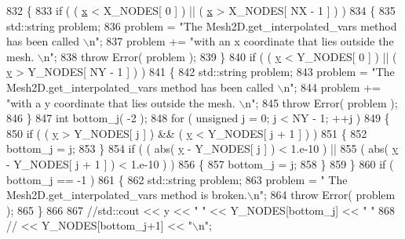 \begin{DoxyCode}
832   \{
833     \textcolor{keywordflow}{if} ( ( \hyperlink{namespaceHeat__plot_aa88370c16b85b784ccbde3ed88bc1991}{x} < X\_NODES[ 0 ] ) || ( \hyperlink{namespaceHeat__plot_aa88370c16b85b784ccbde3ed88bc1991}{x} > X\_NODES[ NX - 1 ] ) )
834     \{
835       std::string problem;
836       problem = \textcolor{stringliteral}{"The Mesh2D.get\_interpolated\_vars method has been called \(\backslash\)n"};
837       problem += \textcolor{stringliteral}{"with an x coordinate that lies outside the mesh. \(\backslash\)n"};
838       \textcolor{keywordflow}{throw} Error( problem );
839     \}
840     \textcolor{keywordflow}{if} ( ( \hyperlink{ODE__BVP__test_8cpp_adf764cbdea00d65edcd07bb9953ad2b7ae1f9fdb8b786c63efc4ce44eeacd17f2}{y} < Y\_NODES[ 0 ] ) || ( \hyperlink{ODE__BVP__test_8cpp_adf764cbdea00d65edcd07bb9953ad2b7ae1f9fdb8b786c63efc4ce44eeacd17f2}{y} > Y\_NODES[ NY - 1 ] ) )
841     \{
842       std::string problem;
843       problem = \textcolor{stringliteral}{"The Mesh2D.get\_interpolated\_vars method has been called \(\backslash\)n"};
844       problem += \textcolor{stringliteral}{"with a y coordinate that lies outside the mesh. \(\backslash\)n"};
845       \textcolor{keywordflow}{throw} Error( problem );
846     \}
847     \textcolor{keywordtype}{int} bottom\_j( -2 );
848     \textcolor{keywordflow}{for} ( \textcolor{keywordtype}{unsigned} j = 0; j < NY - 1; ++j )
849     \{
850       \textcolor{keywordflow}{if} ( ( \hyperlink{ODE__BVP__test_8cpp_adf764cbdea00d65edcd07bb9953ad2b7ae1f9fdb8b786c63efc4ce44eeacd17f2}{y} > Y\_NODES[ j ] ) && ( \hyperlink{ODE__BVP__test_8cpp_adf764cbdea00d65edcd07bb9953ad2b7ae1f9fdb8b786c63efc4ce44eeacd17f2}{y} < Y\_NODES[ j + 1 ] ) )
851       \{
852         bottom\_j = j;
853       \}
854       \textcolor{keywordflow}{if} ( ( abs( \hyperlink{ODE__BVP__test_8cpp_adf764cbdea00d65edcd07bb9953ad2b7ae1f9fdb8b786c63efc4ce44eeacd17f2}{y} - Y\_NODES[ j ] ) < 1.e-10 ) ||
855            ( abs( \hyperlink{ODE__BVP__test_8cpp_adf764cbdea00d65edcd07bb9953ad2b7ae1f9fdb8b786c63efc4ce44eeacd17f2}{y} - Y\_NODES[ j + 1 ] ) < 1.e-10 ) )
856       \{
857         bottom\_j = j;
858       \}
859     \}
860     \textcolor{keywordflow}{if} ( bottom\_j == -1 )
861     \{
862       std::string problem;
863       problem = \textcolor{stringliteral}{" The Mesh2D.get\_interpolated\_vars method is broken.\(\backslash\)n"};
864       \textcolor{keywordflow}{throw} Error( problem );
865     \}
866 
867     \textcolor{comment}{//std::cout << y << " " << Y\_NODES[bottom\_j] << " "}
868     \textcolor{comment}{//          << Y\_NODES[bottom\_j+1] << "\(\backslash\)n";}

\end{DoxyCode}
